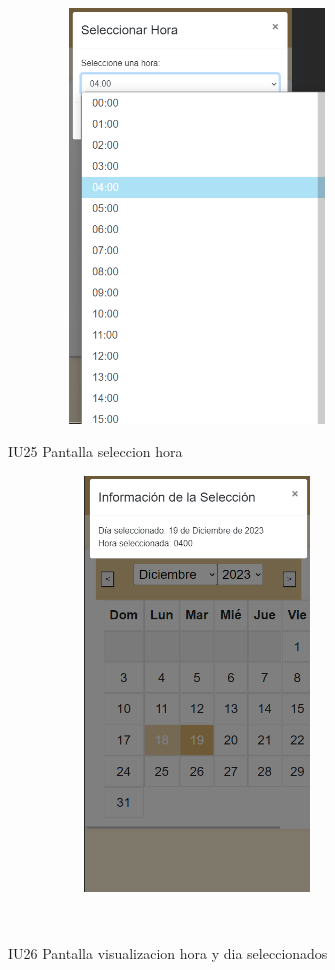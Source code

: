 \begin{figure}[htb]
    \begin{minipage}{1\textwidth}
    \centering
    \includegraphics[width=10cm, height=11cm]{entregable final/pantallasSistema/IU25 Pantalla seleccion hora.png}
    \caption{IU25 Pantalla seleccion hora}
\end{minipage}

    \begin{minipage}{1\textwidth}
        \centering
        \includegraphics[width=10cm, height=11cm]{entregable final/pantallasSistema/IU26 Pantalla visualizacion hora y dia seleccionados.png}
        \caption{IU26 Pantalla visualizacion hora y dia seleccionados}
    \end{minipage}
    \\
\end{figure}
